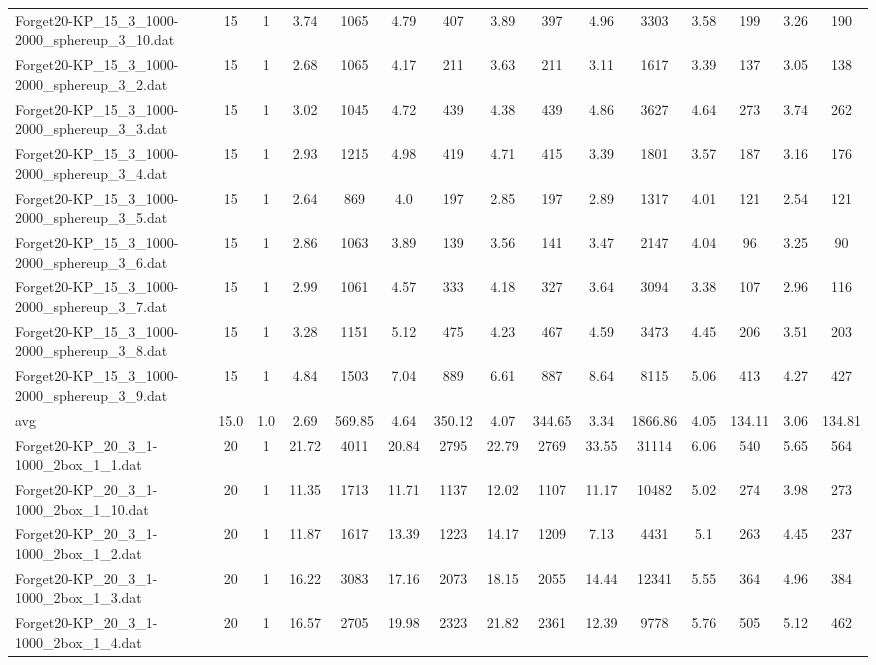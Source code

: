 \begin{table}[!ht]
{\begin{tabular}{lcccccccccccccc}
Forget20-KP\_15\_3\_1000-2000\_sphereup\_3\_10.dat & 15 & 1 & 3.74 & 1065 & 4.79 & 407 & 3.89 & 397 & 4.96 & 3303 & 3.58 & 199 & 3.26 & 190 \\
Forget20-KP\_15\_3\_1000-2000\_sphereup\_3\_2.dat & 15 & 1 & 2.68 & 1065 & 4.17 & 211 & 3.63 & 211 & 3.11 & 1617 & 3.39 & 137 & 3.05 & 138 \\
Forget20-KP\_15\_3\_1000-2000\_sphereup\_3\_3.dat & 15 & 1 & 3.02 & 1045 & 4.72 & 439 & 4.38 & 439 & 4.86 & 3627 & 4.64 & 273 & 3.74 & 262 \\
Forget20-KP\_15\_3\_1000-2000\_sphereup\_3\_4.dat & 15 & 1 & 2.93 & 1215 & 4.98 & 419 & 4.71 & 415 & 3.39 & 1801 & 3.57 & 187 & 3.16 & 176 \\
Forget20-KP\_15\_3\_1000-2000\_sphereup\_3\_5.dat & 15 & 1 & 2.64 & 869 & 4.0 & 197 & 2.85 & 197 & 2.89 & 1317 & 4.01 & 121 & 2.54 & 121 \\
Forget20-KP\_15\_3\_1000-2000\_sphereup\_3\_6.dat & 15 & 1 & 2.86 & 1063 & 3.89 & 139 & 3.56 & 141 & 3.47 & 2147 & 4.04 & 96 & 3.25 & 90 \\
Forget20-KP\_15\_3\_1000-2000\_sphereup\_3\_7.dat & 15 & 1 & 2.99 & 1061 & 4.57 & 333 & 4.18 & 327 & 3.64 & 3094 & 3.38 & 107 & 2.96 & 116 \\
Forget20-KP\_15\_3\_1000-2000\_sphereup\_3\_8.dat & 15 & 1 & 3.28 & 1151 & 5.12 & 475 & 4.23 & 467 & 4.59 & 3473 & 4.45 & 206 & 3.51 & 203 \\
Forget20-KP\_15\_3\_1000-2000\_sphereup\_3\_9.dat & 15 & 1 & 4.84 & 1503 & 7.04 & 889 & 6.61 & 887 & 8.64 & 8115 & 5.06 & 413 & 4.27 & 427 \\
\hline avg & 15.0 & 1.0 & 2.69& 569.85 & 4.64& 350.12 & 4.07& 344.65 & 3.34& 1866.86 & 4.05& 134.11 & 3.06& 134.81\\ \hline
Forget20-KP\_20\_3\_1-1000\_2box\_1\_1.dat & 20 & 1 & 21.72 & 4011 & 20.84 & 2795 & 22.79 & 2769 & 33.55 & 31114 & 6.06 & 540 & 5.65 & 564 \\
Forget20-KP\_20\_3\_1-1000\_2box\_1\_10.dat & 20 & 1 & 11.35 & 1713 & 11.71 & 1137 & 12.02 & 1107 & 11.17 & 10482 & 5.02 & 274 & 3.98 & 273 \\
Forget20-KP\_20\_3\_1-1000\_2box\_1\_2.dat & 20 & 1 & 11.87 & 1617 & 13.39 & 1223 & 14.17 & 1209 & 7.13 & 4431 & 5.1 & 263 & 4.45 & 237 \\
Forget20-KP\_20\_3\_1-1000\_2box\_1\_3.dat & 20 & 1 & 16.22 & 3083 & 17.16 & 2073 & 18.15 & 2055 & 14.44 & 12341 & 5.55 & 364 & 4.96 & 384 \\
Forget20-KP\_20\_3\_1-1000\_2box\_1\_4.dat & 20 & 1 & 16.57 & 2705 & 19.98 & 2323 & 21.82 & 2361 & 12.39 & 9778 & 5.76 & 505 & 5.12 & 462 \\

\end{tabular}}
\end{table}
